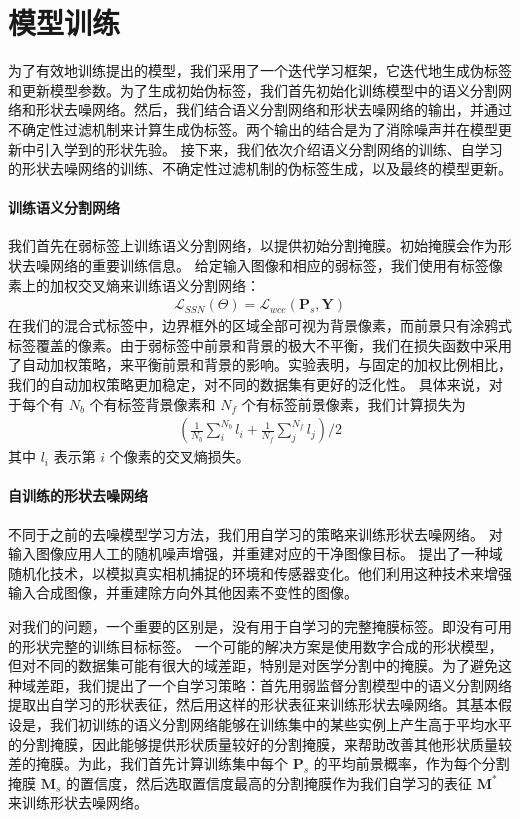 \section{模型训练}
为了有效地训练提出的模型，我们采用了一个迭代学习框架，它迭代地生成伪标签和更新模型参数。为了生成初始伪标签，我们首先初始化训练模型中的语义分割网络和形状去噪网络。然后，我们结合语义分割网络和形状去噪网络的输出，并通过不确定性过滤机制来计算生成伪标签。两个输出的结合是为了消除噪声并在模型更新中引入学到的形状先验。
接下来，我们依次介绍语义分割网络的训练、自学习的形状去噪网络的训练、不确定性过滤机制的伪标签生成，以及最终的模型更新。

\paragraph{训练语义分割网络}
我们首先在弱标签上训练语义分割网络，以提供初始分割掩膜。初始掩膜会作为形状去噪网络的重要训练信息。
给定输入图像和相应的弱标签，我们使用有标签像素上的加权交叉熵来训练语义分割网络：
\begin{align}
    \mathcal{L}_{SSN} (\Theta) = \mathcal{L}_{wce} (\mathbf{P}_s, \mathbf{Y})
\end{align}
在我们的混合式标签中，边界框外的区域全部可视为背景像素，而前景只有涂鸦式标签覆盖的像素。由于弱标签中前景和背景的极大不平衡，我们在损失函数中采用了自动加权策略，来平衡前景和背景的影响。实验表明，与固定的加权比例相比，我们的自动加权策略更加稳定，对不同的数据集有更好的泛化性。
具体来说，对于每个有 $N_b$ 个有标签背景像素和 $N_f$ 个有标签前景像素，我们计算损失为
\begin{align}
    (\frac{1}{N_b} \sum^{N_b}_{i} l_i + \frac{1}{N_f} \sum^{N_f}_{j} l_j) / 2
\end{align}
其中 $l_i$ 表示第 $i$ 个像素的交叉熵损失。

\paragraph{自训练的形状去噪网络}
不同于之前的去噪模型学习方法，我们用自学习的策略来训练形状去噪网络。\citet{vincent2010stacked} 对输入图像应用人工的随机噪声增强，并重建对应的干净图像目标。\citet{Sundermeyer_2018_ECCV} 提出了一种域随机化技术，以模拟真实相机捕捉的环境和传感器变化。他们利用这种技术来增强输入合成图像，并重建除方向外其他因素不变性的图像。

对我们的问题，一个重要的区别是，没有用于自学习的完整掩膜标签。即没有可用的形状完整的训练目标标签。
一个可能的解决方案是使用数字合成的形状模型，但对不同的数据集可能有很大的域差距，特别是对医学分割中的掩膜。为了避免这种域差距，我们提出了一个自学习策略：首先用弱监督分割模型中的语义分割网络提取出自学习的形状表征，然后用这样的形状表征来训练形状去噪网络。其基本假设是，我们初训练的语义分割网络能够在训练集中的某些实例上产生高于平均水平的分割掩膜，因此能够提供形状质量较好的分割掩膜，来帮助改善其他形状质量较差的掩膜。为此，我们首先计算训练集中每个 $\mathbf{P}_s$ 的平均前景概率，作为每个分割掩膜 $\mathbf{M}_s$ 的置信度，然后选取置信度最高的分割掩膜作为我们自学习的表征 $\mathbf{M}^*$ 来训练形状去噪网络。

